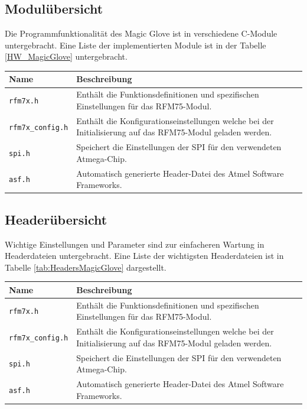 \subsection*{Modulübersicht}
Die Programmfunktionalität des Magic Glove ist in verschiedene C-Module untergebracht. Eine Liste der implementierten Module ist in der Tabelle \ref{HW_MagicGlove} untergebracht.\\ \newline
\begin{tabularx}{\textwidth}{l|X}
	Name & Beschreibung \\ \hline
	\texttt{rfm7x.h} & Enthält die Funktionsdefinitionen und spezifischen Einstellungen für das RFM75-Modul. \\ \hline
	\texttt{rfm7x{\_}config.h} & Enthält die Konfigurationseinstellungen welche bei der Initialisierung auf das RFM75-Modul geladen werden. \\ \hline
	\texttt{spi.h} & Speichert die Einstellungen der SPI für den verwendeten Atmega-Chip. \\ \hline
	\texttt{asf.h} & Automatisch generierte Header-Datei des Atmel Software Frameworks.
	\captionof{table}{Magic Glove: C-Module}
	\label{tab:ModulesMagicGlove}
\end{tabularx}
\subsection*{Headerübersicht}
Wichtige Einstellungen und Parameter sind zur einfacheren Wartung in Headerdateien untergebracht. Eine Liste der wichtigsten Headerdateien ist in Tabelle \ref{tab:HeadersMagicGlove} dargestellt.\\ \newline
\begin{tabularx}{\textwidth}{l|X}
	Name & Beschreibung \\ \hline
	\texttt{rfm7x.h} & Enthält die Funktionsdefinitionen und spezifischen Einstellungen für das RFM75-Modul. \\ \hline
	\texttt{rfm7x{\_}config.h} & Enthält die Konfigurationseinstellungen welche bei der Initialisierung auf das RFM75-Modul geladen werden. \\ \hline
	\texttt{spi.h} & Speichert die Einstellungen der SPI für den verwendeten Atmega-Chip. \\ \hline
	\texttt{asf.h} & Automatisch generierte Header-Datei des Atmel Software Frameworks.
	\label{tab:HeadersMagicGlove}
\end{tabularx}
